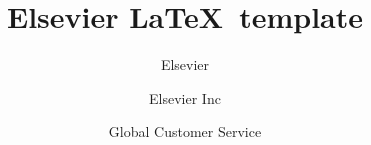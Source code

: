\documentclass[review]{elsarticle}
\begin{document}
\begin{frontmatter}

\title{Elsevier \LaTeX\ template}

\author{Elsevier}
\address{Radarweg 29, Amsterdam}

\author[mymainaddress,mysecondaryaddress]{Elsevier Inc}

\author[mysecondaryaddress]{Global Customer Service}

\address[mymainaddress]{1600 John F Kennedy Boulevard, Philadelphia}
\address[mysecondaryaddress]{360 Park Avenue South, New York}

\begin{abstract}

\end{abstract}

\begin{keyword}

\end{keyword}

\end{frontmatter}

\linenumbers
\end{document}

